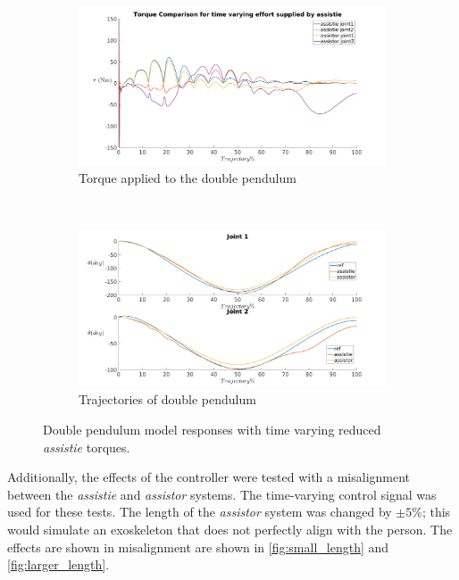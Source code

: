 \begin{figure}[h]
    \centering
    \begin{subfigure}{0.5\textwidth}
        \centering
        \includegraphics[width=\linewidth]{images/controllers/time_varying_torque.png}
        \caption[Double Pendulum: Time varying Torque-Effort]{Torque applied to the double pendulum}
        \label{fig:time_varying_torque}
    \end{subfigure}%
    ~
    \begin{subfigure}{0.5\textwidth}
        \centering
        \includegraphics[width=\linewidth]{images/controllers/time_varying_traj.png}
        \caption[Double Pendulum: Time Varying Effort-Trajectory]{Trajectories of double pendulum}
        \label{fig:time_varying_traj}
    \end{subfigure}
    \caption[Double Pendulum: Time Varying Torque]{Double pendulum model responses with time varying reduced \textit{ assistie} torques.}
    \label{fig:time_varying}
\end{figure}


Additionally, the effects of the controller were tested with a misalignment between the \textit{assistie} and \textit{assistor} systems. The time-varying control signal was used for these tests. The length of the \textit{assistor} system was changed by $\pm 5\%$; this would simulate an exoskeleton that does not perfectly align with the person. The effects are shown in misalignment are shown in \autoref{fig:small_length} and \autoref{fig:larger_length}.

